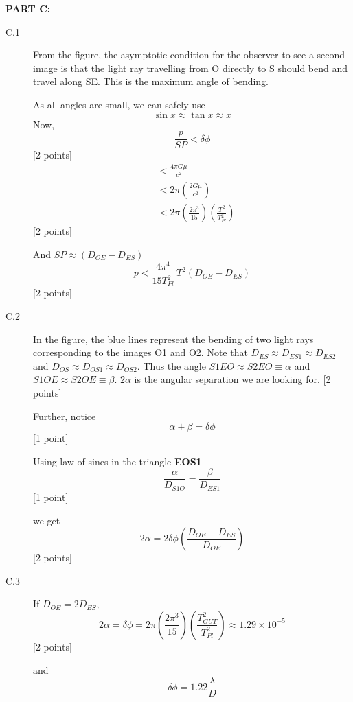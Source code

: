 \textbf{PART C:}

\begin{description}
\item[C.1] From the figure, the asymptotic condition for the observer to
  see a second image is that the light ray travelling from O directly to
  S should bend and travel along SE. This is the maximum angle of
  bending.

  As all angles are small, we can safely use
  \[ \sin x \approx \tan x \approx x \]
  Now,
  \[ \frac{p}{SP} < \delta\phi \]
  \hfill[2 points]
  \begin{align*}
  &< \frac{4\pi G\mu}{c^2}\\
  &< 2\pi\left(\frac{2G\mu}{c^2}\right)\\
  &< 2\pi\left(\frac{2\pi^3}{15}\right)
     \left(\frac{T^2}{T_{Pl}^2}\right)
  \end{align*}
  \hfill[2 points]

  And $SP \approx \left(D_{OE} - D_{ES}\right)$
  \[ p < \frac{4\pi^4}{15T_{Pl}^2}\,T^2\left(D_{OE} - D_{ES}\right) \]
  \hfill[2 points]


\item[C.2] In the figure, the blue lines represent the bending of two
  light rays corresponding to the images O1 and O2. Note that
  $D_{ES} \approx D_{ES1} \approx D_{ES2}$ and
  $D_{OS} \approx D_{OS1} \approx D_{OS2}$. Thus the angle
  $S1EO \approx S2EO \equiv \alpha$ and
  $S1OE \approx S2OE \equiv \beta$. $2\alpha$ is the angular separation
  we are looking for. \hfill[2 points]

  Further, notice
  \[ \alpha + \beta = \delta\phi \]
  \hfill[1 point]

  Using law of sines in the triangle \textbf{EOS1}
  \[ \frac{\alpha}{D_{S1O}} = \frac{\beta}{D_{ES1}} \]
  \hfill[1 point]

  we get
  \[ 2\alpha = 2\delta\phi
     \left(\frac{D_{OE} - D_{ES}}{D_{OE}}\right) \]
  \hfill[2 points]

\item[C.3] If $D_{OE} = 2D_{ES}$,
  \[ 2\alpha = \delta\phi
     = 2\pi\left(\frac{2\pi^3}{15}\right)
       \left(\frac{T_{GUT}^2}{T_{Pl}^2}\right)
     \approx 1.29\times 10^{-5} \]
  \hfill[2 points]

  and
  \[ \delta\phi = 1.22\frac{\lambda}{D} \]


\end{description}
